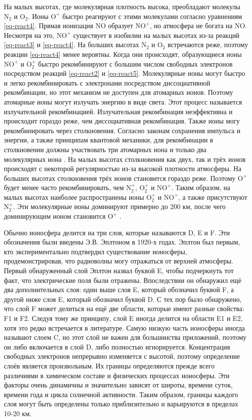 На малых высотах, где молекулярная плотность высока, преобладают молекулы $\text{N}_2$ и $\text{O}_2$.
Ионы $\text{O}^{+}$ быстро реагируют с этими молекулами согласно уравнениям \eqref{eq-react4}.
Прямая ионизация NO образует $\text{NO}^{+}$, но атмосфера не богата на NO.
Несмотря на это, $\text{NO}^{+}$ существует в изобилии на малых высотах из-за реакций \eqref{eq-react3} и \eqref{eq-react4}. 
На больших высотах $\text{N}_2$ и $\text{O}_2$ встречаются реже, поэтому реакции \eqref{eq-react4} менее вероятны.
Когда они происходят, образующиеся ионы $\text{NO}^{+}$ и $\text{O}_2^{+}$ быстро рекомбинируют с большим числом свободных электронов посредством реакций \eqref{eq-react2} и \eqref{eq-react5}.
Молекулярные ионы могут быстро и легко рекомбинировать с электронами посредством диссоциативной рекомбинации, но этот механизм не доступен для атомарных ионов.
Поэтому атомарные ионы могут излучать энергию в виде света.
Этот процесс называется излучательной рекомбинацией.
Излучательная рекомбинация неэффективна и происходит гораздо реже, чем диссоциативная рекомбинация.
Также ионы могу рекомбинировать через столкновения.
Согласно законам сохранения импульса и энергии, а также принципам квантовой механики, для рекомбинации в столкновении должны участвовать три атомарных иона и только два молекулярных иона \cite{Rishbeth2003}.
На малых высотах столкновения как двух, так и трёх ионов происходят с некоторой регулярностью из-за высокой плотности атмосферы.
На больших высотах столкновения трёх ионов становится гораздо реже.
Поэтому $\text{O}^{+}$ будет менее часто рекомбинировать, чем $\text{N}_2^{+}$, $\text{O}_2^{+}$ и $\text{NO}^{+}$.   
Таким образом, на малых высотах наиболее распространены ионы $\text{O}_2^{+}$ и $\text{NO}^{+}$, а также присутствуют $\text{N}_2^{+}$.
Эти молекулярные ионы доминируют примерно до 200 км, после чего доминирующим ионом становится $\text{O}^{+}$ \cite{Rishbeth2003}.

Обычно ионосфера делится на три слоя, которые называются D, E и F.
Эти обозначения были введены Э.В. Эплтоном в 1920-х годах.
Эплтон был первым, кто экспериментально подтвердил существование ионосферы, продемонстрировав, что радиоволны могу отражаться от верхней атмосферы.
Первый обнаруженный слой Эплтон назвал буквой E, чтобы подчеркнуть тот факт, что электрические поля были отражены.
Впоследствии он обнаружил ещё два дополнительных слоя: один выше слоя E, который обозначил буквой F, а другой ниже слоя E, который обозначил буквой D. 
С тех пор было обнаружено, что слой F может делиться на ещё две области, которые имеют разные свойства: F1 и F2.
Следуя тому же принципу, слой E иногда делится на области E1 и E2, хотя это редко встречается в литературе.
Самую низкую часть ионосферы иногда называют слоем C, но этот слой не важен для большинства приложений, поэтому он либо включается в слой D, либо полностью игнорируется.
Концентрация свободных электронов непрерывно изменяется с высотой, поэтому определение слоёв является произвольным.
Их границы определяются прежде всего различиями в химическом составе и физических процессах ионосферы.
Эти факторы очень динамичны и значительно зависят от широты, времени суток, времени года и цикла солнечной активности.
Таким образом, границы каждого слоя могут быть определены только приблизительно и варьируются в пределах 10-20 км.

